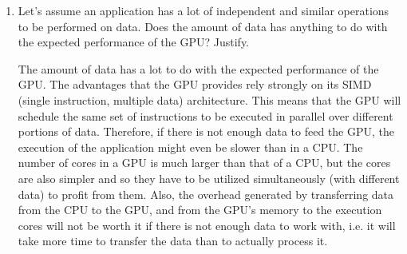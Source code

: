 \documentclass{article}
\begin{document}
\begin{enumerate}[1.]
    \item Let’s assume an application has a lot of independent and similar operations to be performed on data. Does the amount of data has anything to do with the expected performance of the GPU? Justify.
    
    The amount of data has a lot to do with the expected performance of the GPU. The advantages that the GPU provides rely strongly on its SIMD (single instruction, multiple data) architecture. This means that the GPU will schedule the same set of instructions to be executed in parallel over different portions of data. Therefore, if there is not enough data to feed the GPU, the execution of the application might even be slower than in a CPU. The number of cores in a GPU is much larger than that of a CPU, but the cores are also simpler and so they have to be utilized simultaneously (with different data) to profit from them. Also, the overhead generated by transferring data from the CPU to the GPU, and from the GPU's memory to the execution cores will not be worth it if there is not enough data to work with, i.e. it will take more time to transfer the data than to actually process it.


\end{enumerate}
\end{document}
